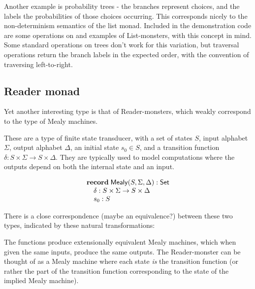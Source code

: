 \documentclass{article}
\begin{document}
Another example is probability trees - the branches represent choices, and the labels the probabilities of those choices occurring. This corresponds nicely to the non-determinism semantics of the list monad. Included in the demonstration code are some operations on and examples of List-monsters, with this concept in mind. \\

Some standard operations on trees don't work for this variation, but traversal operations return the branch labels in the expected order, with the convention of traversing left-to-right. 

\subsection{Reader monad}

Yet another interesting type is that of Reader-monsters, which weakly correspond to the type of Mealy machines. 

These are a type of finite state transducer, with a set of states $S$, input alphabet $\Sigma$, output alphabet $\Delta$, an initial state $s_0 \in S$, and a transition function $\delta : S \times \Sigma \to S \times \Delta$. They are typically used to model computations where the outputs depend on both the internal state and an input.

$$
\begin{array}[t]{l}
\mathbf{record}\;
\mathsf{Mealy}(S,\Sigma,\Delta):\mathsf{Set}\\
\quad \delta : S \times \Sigma \to S \times \Delta \\
\quad s_0 : S
\end{array}
$$

There is a close correspondence (maybe an equivalence?) between these two types, indicated by these natural transformations:

The functions produce extensionally equivalent Mealy machines, which when given the same inputs, produce the same outputs. The Reader-monster can be thought of as a Mealy machine where each state \emph{is} the transition function (or rather the part of the transition function corresponding to the state of the implied Mealy machine). \\
\end{document}
